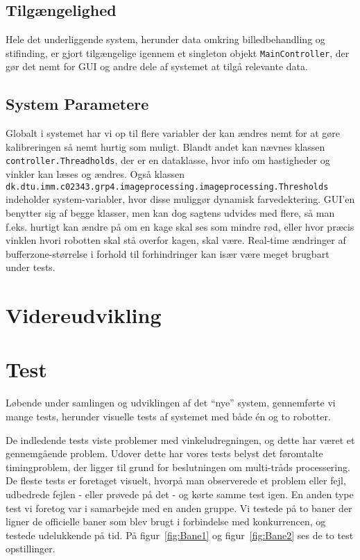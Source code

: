 \subsection{Tilgængelighed}
Hele det underliggende system, herunder data omkring billedbehandling og stifinding, er gjort tilgængelige igennem et singleton objekt \texttt{MainController}, der gør det nemt for GUI og andre dele af systemet at tilgå relevante data.

\subsection{System Parametere}\label{system-parametere}
Globalt i systemet har vi op til flere variabler der kan ændres nemt for at gøre kalibreringen så nemt hurtig som muligt. Blandt andet kan nævnes klassen \texttt{controller.Threadholds}, der er en dataklasse, hvor info om hastigheder og vinkler kan læses og ændres. Også klassen \texttt{dk.dtu.imm.c02343.grp4.imageprocessing.imageprocessing.Thresholds} indeholder system-variabler, hvor disse muliggør dynamisk farvedektering. GUI’en benytter sig af begge klasser, men kan dog sagtens udvides med flere, så man f.eks. hurtigt kan ændre på om en kage skal ses som mindre rød, eller hvor præcis vinklen hvori robotten skal stå overfor kagen, skal være. Real-time ændringer af bufferzone-størrelse i forhold til forhindringer kan især være meget brugbart under tests.


\section{Videreudvikling}

\section{Test}
Løbende under samlingen og udviklingen af det “nye” system, gennemførte vi mange tests, herunder visuelle tests af systemet med både én og to robotter.

De indledende tests viste problemer med vinkeludregningen, og dette har været et gennemgående problem. Udover dette har vores tests belyst det føromtalte timingproblem, der ligger til grund for beslutningen om multi-tråds processering. De fleste tests er foretaget visuelt, hvorpå man observerede et problem eller fejl, udbedrede fejlen - eller prøvede på det - og kørte samme test igen.
En anden type test vi foretog var i samarbejde med en anden gruppe. Vi testede på to baner der ligner de officielle baner som blev brugt i forbindelse med konkurrencen, og testede udelukkende på tid. På figur~\vref{fig:Bane1} og figur~\vref{fig:Bane2} ses de to test opstillinger.


